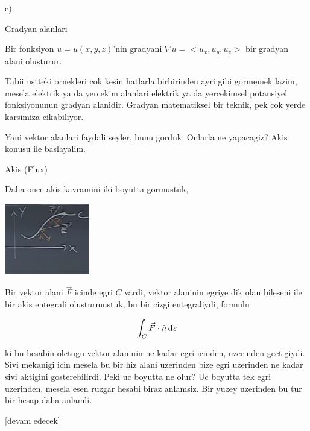 \documentclass[12pt,fleqn]{article}\usepackage{../../common}
\begin{document}
c)

Gradyan alanlari

Bir fonksiyon $u = u(x,y,z)$'nin gradyani $\nabla u = < u_x, u_y, u_z >$
bir gradyan alani olusturur.

Tabii ustteki ornekleri cok kesin hatlarla birbirinden ayri gibi gormemek lazim,
mesela elektrik ya da yercekim alanlari elektrik ya da yercekimsel potansiyel
fonksiyonunun gradyan alanidir. Gradyan matematiksel bir teknik, pek cok
yerde karsimiza cikabiliyor.

Yani vektor alanlari faydali seyler, bunu gorduk. Onlarla ne yapacagiz?
Akis konusu ile baslayalim.

Akis (Flux)

Daha once akis kavramini iki boyutta gormustuk,

\includegraphics[width=10em]{calc_multi_27_02.png}

Bir vektor alani $\vec{F}$ icinde egri $C$ vardi, vektor alaninin
egriye dik olan bileseni ile bir akis entegrali olusturmustuk, bu
bir cizgi entegraliydi, formulu

$$
\int_C \vec{F} \cdot \hat{n} \,\mathrm{d} s
$$

ki bu hesabin olctugu vektor alaninin ne kadar egri icinden, uzerinden
gectigiydi.  Sivi mekanigi icin mesela bu bir hiz alani uzerinden bize egri
uzerinden ne kadar sivi aktigini gosterebilirdi. Peki uc boyutta ne olur? Uc
boyutta tek egri uzerinden, mesela esen ruzgar hesabi biraz anlamsiz.
Bir yuzey uzerinden bu tur bir hesap daha anlamli.










[devam edecek]
\end{document}

